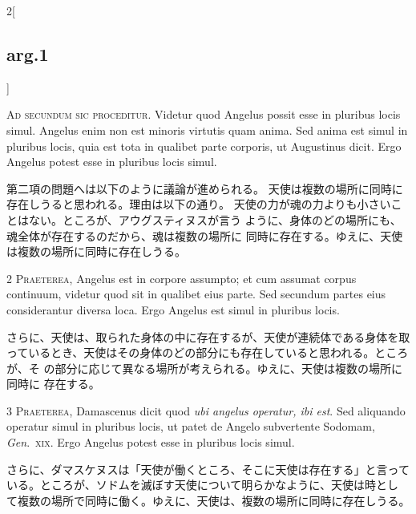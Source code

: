 \documentclass[paper=a4paper,fontsize=10pt,jafontsize=9pt,titlepage]{jlreq}
\begin{document}
\begin{paracol}{2}[\subsection{arg.1}]

{\huge A}{\scshape d secundum sic proceditur}. Videtur quod
Angelus possit esse in pluribus locis simul. Angelus enim non est
minoris virtutis quam anima. Sed anima est simul in pluribus locis, quia
est tota in qualibet parte corporis, ut Augustinus dicit. Ergo Angelus
potest esse in pluribus locis simul.

\switchcolumn

第二項の問題へは以下のように議論が進められる。
天使は複数の場所に同時に存在しうると思われる。理由は以下の通り。
天使の力が魂の力よりも小さいことはない。ところが、アウグスティヌスが言う
 ように、身体のどの場所にも、魂全体が存在するのだから、魂は複数の場所に
 同時に存在する。ゆえに、天使は複数の場所に同時に存在しうる。


{\scshape 2 Praeterea}, Angelus est in corpore assumpto;
et cum assumat corpus continuum, videtur quod sit in qualibet eius
parte. Sed secundum partes eius considerantur diversa loca. Ergo Angelus
est simul in pluribus locis.

\switchcolumn

さらに、天使は、取られた身体の中に存在するが、天使が連続体である身体を取
っているとき、天使はその身体のどの部分にも存在していると思われる。ところが、そ
 の部分に応じて異なる場所が考えられる。ゆえに、天使は複数の場所に同時に
 存在する。


{\scshape 3 Praeterea}, Damascenus dicit quod {\itshape ubi
angelus operatur, ibi est}. Sed aliquando operatur simul in pluribus
locis, ut patet de Angelo subvertente Sodomam, {\itshape Gen}.~{\scshape xix}. Ergo Angelus
potest esse in pluribus locis simul.

\switchcolumn

さらに、ダマスケヌスは「天使が働くところ、そこに天使は存在する」と言って
 いる。ところが、ソドムを滅ぼす天使について明らかなように、天使は時とし
 て複数の場所で同時に働く。ゆえに、天使は、複数の場所に同時に存在しうる。


\end{paracol}
\end{document}
